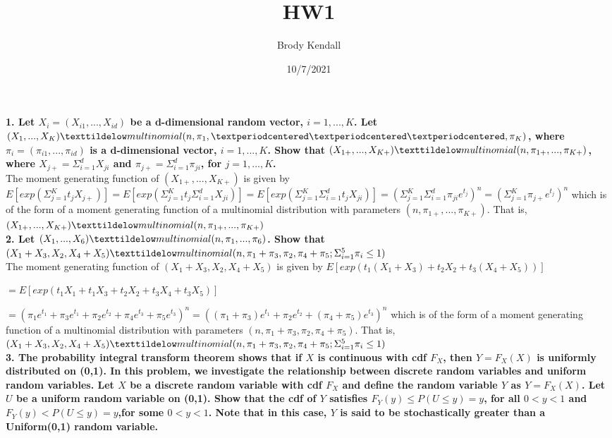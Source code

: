 \documentclass{article}
\title{HW1}
\author{Brody Kendall}
\date{10/7/2021}
\begin{document}
\maketitle

\textbf{1. Let $X_i= (X_{i1},..., X_{id})$ be a d-dimensional random vector, $i= 1,...,K$. Let $(X_1,...,X_K) \texttildelow multinomial(n, \pi_1,···, \pi_K)$, where $\pi_i= (\pi_{i1},..., \pi_{id})$ is a d-dimensional vector, $i= 1,...,K$. Show that $(X_{1+},..., X_{K+}) \texttildelow multinomial(n, \pi_{1+},..., \pi_{K+})$, where $X_{j+}=\Sigma ^d_{i=1}X_{ji}$ and $\pi_{j+}=\Sigma^d_{i=1}\pi_{ji}$, for $j=1,...,K$.}\\

The moment generating function of $(X_{1+},..., X_{K+})$ is given by $E[exp(\Sigma_{j=1}^K t_jX_{j+})] = E[exp(\Sigma_{j=1}^K t_j \Sigma_{i=1}^d X_{ji})] = E[exp(\Sigma_{j=1}^K\Sigma_{i=1}^d t_jX_{ji})] = (\Sigma_{j=1}^K \Sigma_{i=1}^d \pi_{ji}e^{t_j})^n = (\Sigma_{j=1}^K\pi_{j+}e^{t_j})^n$ which is of the form of a moment generating function of a multinomial distribution with parameters $(n, \pi_{1+},...,\pi_{K+})$. That is, $(X_{1+},..., X_{K+}) \texttildelow multinomial(n, \pi_{1+},..., \pi_{K+})$
\\

\textbf{2. Let $(X_1,..., X_6) \texttildelow multinomial(n, \pi_1,..., \pi_6)$. Show that $(X_1+X_3, X_2, X_4+X_5) \texttildelow multinomial (n, \pi_1+\pi_3, \pi_2, \pi_4+\pi_5; \Sigma^5_{i=1} \pi_i \leq 1)$}\\

The moment generating function of $(X_1 + X_3, X_2, X_4 + X_5)$ is given by $E[exp(t_1(X_1 + X_3) + t_2X_2 + t_3(X_4 + X_5))]$

$= E[exp(t_1X_1 + t_1X_3 + t_2X_2 + t_3X_4 + t_3X_5)]$

$ = (\pi_1e^{t_1} + \pi_3e^{t_1} + \pi_2e^{t_2} + \pi_4e^{t_3} + \pi_5e^{t_3})^n  = ((\pi_1 + \pi_3)e^{t_1} + \pi_2e^{t_2} + (\pi_4 + \pi_5)e^{t_3})^n$ which is of the form of a moment generating function of a multinomial distribution with parameters $(n, \pi_1 + \pi_3, \pi_2, \pi_4 + \pi_5)$. That is, $(X_1+X_3, X_2, X_4+X_5) \texttildelow multinomial (n, \pi_1+\pi_3, \pi_2, \pi_4+\pi_5; \Sigma^5_{i=1} \pi_i \leq 1)$
\\


\textbf{3. The probability integral transform theorem shows that if $X$ is continuous with cdf $F_X$, then $Y=F_X(X)$ is uniformly distributed on (0,1). In this problem, we investigate the relationship between discrete random variables and uniform random variables. Let $X$ be a discrete random variable with cdf $F_X$ and define the random variable $Y$ as $Y=F_X(X)$. Let $U$ be a uniform random variable on (0,1). Show that the cdf of $Y$ satisfies $F_Y(y) \leq P(U \leq y) =y$, for all $0<y<1$ and $F_Y(y)< P(U\leq y) =y$,for some $0< y <1$. Note that in this case, $Y$ is said to be stochastically greater than a Uniform(0,1) random variable.}\\
\end{document}
